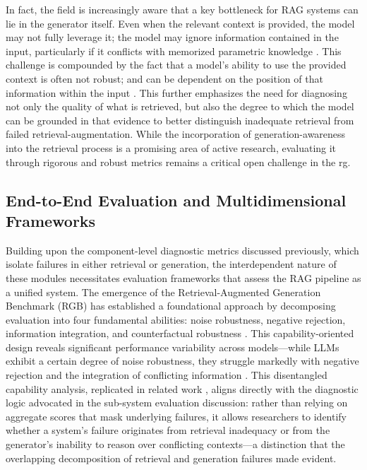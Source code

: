 \documentclass[11pt,a4paper]{article}
\begin{document}
In fact, the field is increasingly aware that a key bottleneck for RAG systems can lie in the generator itself. Even when the relevant context is provided, the model may not fully leverage it; the model may ignore information contained in the input, particularly if it conflicts with memorized parametric knowledge \cite{arxiv:2212.10511v4}. This challenge is compounded by the fact that a model's ability to use the provided context is often not robust; and can be dependent on the position of that information within the input \cite{arxiv:2307.03172v3,arxiv:2404.08865v1}. This further emphasizes the need for diagnosing not only the quality of what is retrieved, but also the degree to which the model can be grounded in that evidence to better distinguish inadequate retrieval from failed retrieval-augmentation. While the incorporation of generation-awareness into the retrieval process is a promising area of active research, evaluating it through rigorous and robust metrics remains a critical open challenge in the rg.


\subsection{End-to-End Evaluation and Multidimensional Frameworks}


Building upon the component-level diagnostic metrics discussed previously, which isolate failures in either retrieval or generation, the interdependent nature of these modules necessitates evaluation frameworks that assess the RAG pipeline as a unified system. The emergence of the Retrieval-Augmented Generation Benchmark (RGB) has established a foundational approach by decomposing evaluation into four fundamental abilities: noise robustness, negative rejection, information integration, and counterfactual robustness \cite{arxiv:2309.01431v2}. This capability-oriented design reveals significant performance variability across models---while LLMs exhibit a certain degree of noise robustness, they struggle markedly with negative rejection and the integration of conflicting information \cite{arxiv:2309.01431v2}. This disentangled capability analysis, replicated in related work \cite{arxiv:2405.07437v2}, aligns directly with the diagnostic logic advocated in the sub-system evaluation discussion: rather than relying on aggregate scores that mask underlying failures, it allows researchers to identify whether a system's failure originates from retrieval inadequacy or from the generator's inability to reason over conflicting contexts---a distinction that the overlapping decomposition of retrieval and generation failures made evident.
\end{document}
